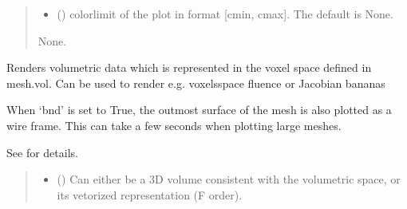 \documentclass[letterpaper,10pt,english]{sphinxmanual}
\begin{document}
\begin{fulllineitems}
\begin{fulllineitems}
\begin{quote}
\begin{description}
\begin{itemize}
\item {} 
\sphinxAtStartPar
{} (\sphinxstyleliteralemphasis{\sphinxupquote{, }}) \textendash{} colorlimit of the plot in format {[}cmin, cmax{]}. The default is None.

\end{itemize}

\sphinxAtStartPar
None.

\end{description}\end{quote}

\end{fulllineitems}


\begin{fulllineitems}
\label{\detokenize{_autosummary/nirfasterff.base.dcs_mesh.dcsmesh:nirfasterff.base.dcs_mesh.dcsmesh.plotvol}}
\pysigstartsignatures
\pysiglinewithargsret
{}
{\sphinxparamcomma {}\sphinxparamcomma {}\sphinxparamcomma {}\sphinxparamcomma {}\sphinxparamcomma {}}
{}
\pysigstopsignatures
\sphinxAtStartPar
Renders volumetric data which is represented in the voxel space defined in mesh.vol.
Can be used to render e.g. voxels\sphinxhyphen{}space fluence or Jacobian bananas

\sphinxAtStartPar
When ‘bnd’ is set to True, the outmost surface of the mesh is also plotted as a wire frame.
This can take a few seconds when plotting large meshes.

\sphinxAtStartPar
See {\hyperref[\detokenize{_autosummary/nirfasterff.visualize.plotvol:nirfasterff.visualize.plotvol}]{}} for details.
\begin{quote}\begin{description}
\begin{itemize}
\item {} 
\sphinxAtStartPar
{} () \textendash{} Can either be a 3D volume consistent with the volumetric space, or its vetorized representation (F order).


\end{itemize}
\end{description}
\end{quote}
\end{fulllineitems}
\end{fulllineitems}
\end{document}
